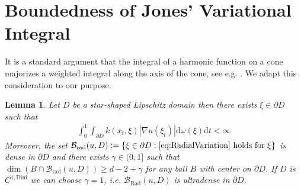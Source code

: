 \documentclass[a4paper,12pt]{article}
\newtheorem{lemma}[theorem]{Lemma}
\theoremstyle{definition}
\theoremstyle{definition}
\begin{document}
	\section{Boundedness of Jones' Variational Integral}\label{sec:LPVar}
	It is a standard argument that the integral of a harmonic function on a cone majorizes a weighted integral along the axis of the cone, see e.g. \cite[Chapter ]{Stein70}. We adapt this consideration to our purpose.
	\begin{lemma}\label{lem:RadVar}
		Let $D$ be a star-shaped Lipschitz domain then there exists $\xi\in\partial D$ such that
		\begin{align}\label{eq:RadialVariation}
			\int_0^1\int_{\partial D}k(x_t,\xi)|\nabla u(\xi_t)|\mathrm d\omega(\xi)\mathrm dt<\infty
		\end{align}
		Moreover, the set $\mathcal B_{\mathrm{rad}}(u, D):=\lbrace\xi\in\partial D: \eqref{eq:RadialVariation} \text{ holds for }\xi\rbrace$ is dense in $\partial D$ and there exists $\gamma\in(0,1]$ such that $\dim(B\cap\mathcal B_{\mathrm{rad}}(u, D))\geq d-2+\gamma$ for any ball $B$ with center on $\partial D$. If $D$ is $C^{1,\mathrm{Dini}}$ we can choose $\gamma=1$, i.e. $\mathcal{B}_{\mathrm{Rad}}(u, D)$ is ultradense in $\partial D$.
	\end{lemma}
\end{document}
